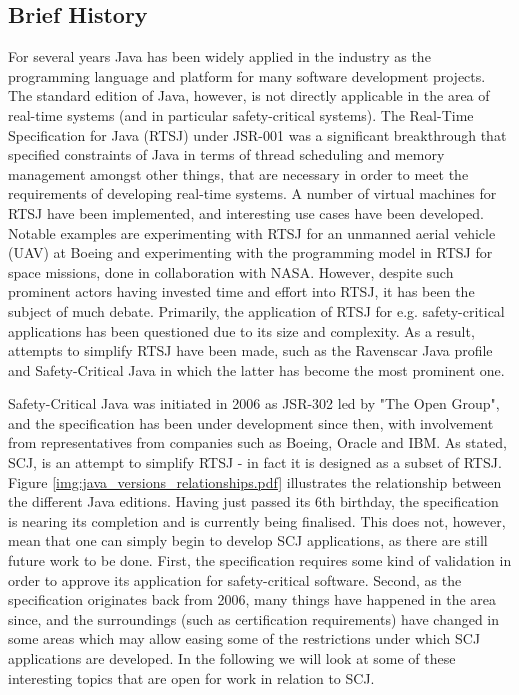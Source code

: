 \subsection{Brief History} %
\label{sub:brief_history_of_java_for_safety_critical_systems}
For several years Java has been widely applied in the industry as the programming language and platform for many software development projects. The standard edition of Java, however, is not directly applicable in the area of real-time systems (and in particular safety-critical systems). The Real-Time Specification for Java (RTSJ) under JSR-001\cite{alan2001real}\cite{henties:2009-20} was a significant breakthrough that specified constraints of Java in terms of thread scheduling and memory management amongst other things, that are necessary in order to meet the requirements of developing real-time systems. A number of virtual machines for RTSJ have been implemented, and interesting use cases have been developed. Notable examples are experimenting with RTSJ for an unmanned aerial vehicle (UAV) at Boeing\cite{Armbruster:2007:RJV:1324969.1324974} and experimenting with the programming model in RTSJ for space missions, done in collaboration with NASA\cite{DBLP:conf/isorc/DvorakBCCCGIMMR04}. However, despite such prominent actors having invested time and effort into RTSJ, it has been the subject of much debate. Primarily, the application of RTSJ for e.g. safety-critical applications has been questioned due to its size and complexity. As a result, attempts to simplify RTSJ have been made, such as the Ravenscar Java profile and Safety-Critical Java in which the latter has become the most prominent one.

Safety-Critical Java was initiated in 2006 as JSR-302 led by "The Open Group", and the specification has been under development since then, with involvement from representatives from companies such as Boeing, Oracle and IBM. As stated, SCJ, is an attempt to simplify RTSJ - in fact it is designed as a subset of RTSJ. Figure \ref{img:java_versions_relationships.pdf} illustrates the relationship between the different Java editions. Having just passed its 6th birthday, the specification is nearing its completion and is currently being finalised. This does not, however, mean that one can simply begin to develop SCJ applications, as there are still future work to be done. First, the specification requires some kind of validation in order to approve its application for safety-critical software. Second, as the specification originates back from 2006, many things have happened in the area since, and the surroundings (such as certification requirements) have changed in some areas which may allow easing some of the restrictions under which SCJ applications are developed. In the following we will look at some of these interesting topics that are open for work in relation to SCJ.

